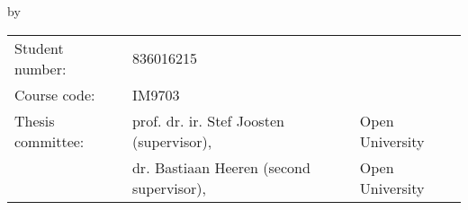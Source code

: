 \begin{titlepage}

\begin{center}


\vspace*{2\bigskipamount}

{\makeatletter
\titlestyle\color{red}\Huge\@title
\makeatother}

{\makeatletter
\ifx\@subtitle\undefined\else
    \bigskip
    \titlefont\titleshape\LARGE\@subtitle
\fi
\makeatother}

\bigskip
\bigskip

by

\bigskip
\bigskip

{\makeatletter
\titlefont\Large\bfseries\@author
\makeatother}


\bigskip
\bigskip



\bigskip
\bigskip


\begin{tabular}{lll}
    Student number: & 836016215 \\
    Course code: & \textsc{IM}9703\\
    Thesis committee:
        & prof. dr. ir. Stef Joosten (supervisor), & Open University \\
        & dr. Bastiaan Heeren (second supervisor), & Open University
\end{tabular}


\bigskip


\bigskip

\end{center}

\end{titlepage} 
